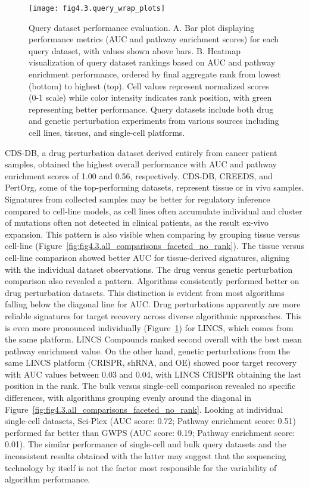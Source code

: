 \begin{figure}[htbp]
    \centering
    \texttt{[image: fig4.3.query\_wrap\_plots]}
    \caption[Query dataset performance evaluation.]{Query dataset performance evaluation. A. Bar plot displaying performance metrics (AUC and pathway enrichment scores) for each query dataset, with values shown above bars. B. Heatmap visualization of query dataset rankings based on AUC and pathway enrichment performance, ordered by final aggregate rank from lowest (bottom) to highest (top). Cell values represent normalized scores (0-1 scale) while color intensity indicates rank position, with green representing better performance. Query datasets include both drug and genetic perturbation experiments from various sources including cell lines, tissues, and single-cell platforms.}
    \label{fig:fig4.3.query_wrap_plots}
\end{figure}

\gls{CDS-DB}, a drug perturbation dataset derived entirely from cancer patient samples, obtained the highest overall performance with AUC and pathway enrichment scores of 1.00 and 0.56, respectively. CDS-DB, CREEDS, and PertOrg, some of the top-performing datasets, represent tissue or in vivo samples. Signatures from collected samples may be better for regulatory inference compared to cell-line models, as cell lines often accumulate individual and cluster of mutations often not detected in clinical patients, as the result ex-vivo expansion. This pattern is also visible when comparing by grouping tissue versus cell-line (Figure~\ref{fig:fig4.3.all_comparisons_faceted_no_rank}). The tissue versus cell-line comparison showed better AUC for tissue-derived signatures, aligning with the individual dataset observations. The drug versus genetic perturbation comparison also revealed a pattern. Algorithms consistently performed better on drug perturbation datasets. This distinction is evident from most algorithms falling below the diagonal line for AUC. Drug perturbations apparently are more reliable signatures for target recovery across diverse algorithmic approaches. This is even more pronounced individually (Figure~\ref{fig:fig4.3.query_wrap_plots}) for LINCS, which comes from the same platform. LINCS Compounds ranked second overall with the best mean pathway enrichment value. On the other hand, genetic perturbations from the same LINCS platform (CRISPR, shRNA, and OE) showed poor target recovery with AUC values between 0.03 and 0.04, with LINCS CRISPR obtaining the last position in the rank. The bulk versus single-cell comparison revealed no specific differences, with algorithms grouping evenly around the diagonal in Figure~\ref{fig:fig4.3.all_comparisons_faceted_no_rank}. Looking at individual single-cell datasets, Sci-Plex (AUC score: 0.72; Pathway enrichment score: 0.51) performed far better than GWPS (AUC score: 0.19; Pathway enrichment score: 0.01). The similar performance of single-cell and bulk query datasets and the inconsistent results obtained with the latter may suggest that the sequencing technology by itself is not the factor most responsible for the variability of algorithm performance.


